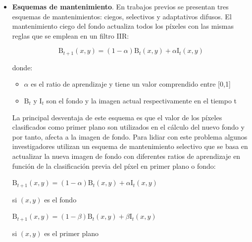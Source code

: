 \begin{itemize}
    \item \textbf{Esquemas de mantenimiento}. En trabajos previos \cite{4712338} se presentan tres esquemas de mantenimientos: ciegos, selectivos y adaptativos difusos. El mantenimiento ciego del fondo actualiza todos los píxeles con las mismas reglas que se emplean en un filtro IIR:
    
    \begin{equation}
    \label{eq:IIR-filter}
    \text{B}_{t+1}(x,y) = (1 - \alpha)\text{B}_{t}(x,y) + \alpha\text{I}_{t}(x,y)
    \end{equation}
    
    donde:
    
    \begin{itemize}
        \item $\alpha$ es el ratio de aprendizaje y tiene un valor comprendido entre [0,1]
        \item $\text{B}_{t}$ y $\text{I}_{t}$ son el fondo y la imagen actual respectivamente en el tiempo t
    \end{itemize}
    
    La principal desventaja de este esquema es que el valor de los píxeles clasificados como primer plano son utilizados en el cálculo del nuevo fondo y por tanto, afecta a la imagen de fondo. Para lidiar con este problema algunos investigadores utilizan un esquema de mantenimiento selectivo que se basa en actualizar la nueva imagen de fondo con diferentes ratios de aprendizaje en función de la clasificación previa del píxel en primer plano o fondo:
    
    \vspace{0.5cm}

    $\text{B}_{t+1}(x,y) = (1 - \alpha)\text{B}_{t}(x,y) + \alpha\text{I}_{t}(x,y)$
    
    \vspace{0.5cm}
    
    si $(x,y)$ es el fondo
    
    \vspace{0.5cm}

    $\text{B}_{t+1}(x,y) = (1 - \beta)\text{B}_{t}(x,y) + \beta\text{I}_{t}(x,y)$
    
    \vspace{0.5cm}
    
    si $(x,y)$ es el primer plano
    
    \vspace{0.5cm}
    

\end{itemize}
